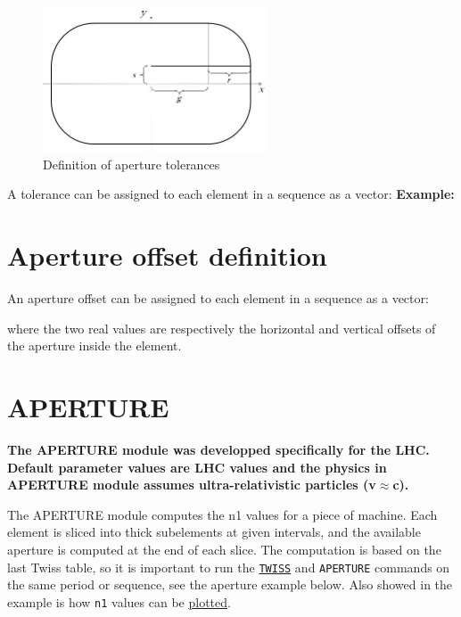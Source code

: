 \begin{figure}[htb]
  \begin{center}
    \includegraphics[width=250px]{jpg/tolerance.jpg}
    \caption{Definition of aperture tolerances}
    \label{fig:aperture_tol}
  \end{center}
\end{figure}

A tolerance can be assigned to each element in a \madx sequence as a vector: 
{\bf Example:}

\section{Aperture offset definition}
\label{sec:aperoffset}

An aperture offset can be assigned to each element in a \madx sequence as a vector: 

where the two real values are respectively the horizontal and vertical
offsets of the aperture inside the element.


\section{APERTURE}
\label{sec:aperture}
{\bf The APERTURE module was developped specifically for the LHC.\\ 
Default parameter values are LHC values and the physics 
in APERTURE module assumes ultra-relativistic particles (v\(\approx\)c).} 

The APERTURE module computes the n1 values for a piece of machine. 
Each element is sliced into thick subelements at given intervals, and
the available aperture is computed at the end of each slice. 
The computation is based on the last Twiss table, so it is important to
run the \hyperref[chap:twiss]{\tt TWISS} and \texttt{APERTURE} commands
on the same period or sequence, see the aperture example below. Also showed in the
example is how {\tt n1} values can be \hyperref[chap:plot]{plotted}.

